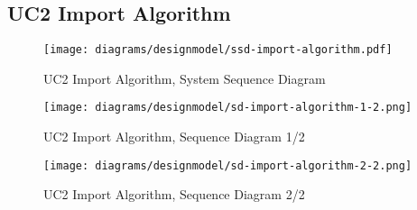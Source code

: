 \subsection{UC2 Import Algorithm}
\begin{figure}[H]
    \centering
    \texttt{[image: diagrams/designmodel/ssd-import-algorithm.pdf]}
    \caption{UC2 Import Algorithm, System Sequence Diagram}
    \label{fig:import-algorithm-ssd}
\end{figure}
\begin{figure}[p]%
  \begin{leftfullpage}
    \texttt{[image: diagrams/designmodel/sd-import-algorithm-1-2.png]}
    \caption{UC2 Import Algorithm, Sequence Diagram 1/2}
    \label{fig:import-algorithm-sd-1}
  \end{leftfullpage}
\end{figure}
\begin{figure}[p]%
  \begin{fullpage}
    \texttt{[image: diagrams/designmodel/sd-import-algorithm-2-2.png]}
    \caption{UC2 Import Algorithm, Sequence Diagram 2/2}
    \label{fig:import-algorithm-sd-2}
  \end{fullpage}
\end{figure}
% 

